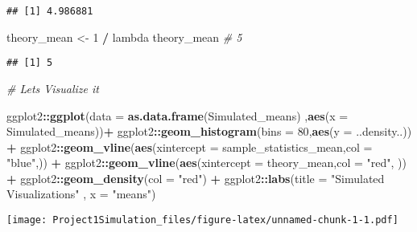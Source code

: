 \documentclass[
]{article}
\newenvironment{Shaded}{\begin{snugshade}}{\end{snugshade}}
\newcommand{\CommentTok}[1]{\textcolor[rgb]{0.56,0.35,0.01}{\textit{#1}}}
\newcommand{\DataTypeTok}[1]{\textcolor[rgb]{0.13,0.29,0.53}{#1}}
\newcommand{\DecValTok}[1]{\textcolor[rgb]{0.00,0.00,0.81}{#1}}
\newcommand{\KeywordTok}[1]{\textcolor[rgb]{0.13,0.29,0.53}{\textbf{#1}}}
\newcommand{\NormalTok}[1]{#1}
\newcommand{\OperatorTok}[1]{\textcolor[rgb]{0.81,0.36,0.00}{\textbf{#1}}}
\newcommand{\StringTok}[1]{\textcolor[rgb]{0.31,0.60,0.02}{#1}}
\begin{document}
\begin{verbatim}
## [1] 4.986881
\end{verbatim}

\begin{Shaded}
\begin{Highlighting}[]
\NormalTok{theory\_mean \textless{}{-}}\StringTok{ }\DecValTok{1} \OperatorTok{/}\StringTok{ }\NormalTok{lambda}
\NormalTok{theory\_mean }\CommentTok{\# 5}
\end{Highlighting}
\end{Shaded}

\begin{verbatim}
## [1] 5
\end{verbatim}

\begin{Shaded}
\begin{Highlighting}[]
\CommentTok{\# Let\textquotesingle{}s Visualize it}

\NormalTok{ggplot2}\OperatorTok{::}\KeywordTok{ggplot}\NormalTok{(}\DataTypeTok{data =} \KeywordTok{as.data.frame}\NormalTok{(Simulated\_means) ,}\KeywordTok{aes}\NormalTok{(}\DataTypeTok{x =}\NormalTok{ Simulated\_means))}\OperatorTok{+}
\StringTok{        }\NormalTok{ggplot2}\OperatorTok{::}\KeywordTok{geom\_histogram}\NormalTok{(}\DataTypeTok{bins =} \DecValTok{80}\NormalTok{,}\KeywordTok{aes}\NormalTok{(}\DataTypeTok{y =}\NormalTok{ ..density..)) }\OperatorTok{+}
\StringTok{        }\NormalTok{ggplot2}\OperatorTok{::}\KeywordTok{geom\_vline}\NormalTok{(}\KeywordTok{aes}\NormalTok{(}\DataTypeTok{xintercept =}\NormalTok{ sample\_statistics\_mean,}\DataTypeTok{col =} \StringTok{"blue"}\NormalTok{,)) }\OperatorTok{+}
\StringTok{        }\NormalTok{ggplot2}\OperatorTok{::}\KeywordTok{geom\_vline}\NormalTok{(}\KeywordTok{aes}\NormalTok{(}\DataTypeTok{xintercept =}\NormalTok{ theory\_mean,}\DataTypeTok{col =} \StringTok{"red"}\NormalTok{,  )) }\OperatorTok{+}\StringTok{ }
\StringTok{        }\NormalTok{ggplot2}\OperatorTok{::}\KeywordTok{geom\_density}\NormalTok{(}\DataTypeTok{col =} \StringTok{"red"}\NormalTok{) }\OperatorTok{+}\StringTok{ }
\StringTok{        }\NormalTok{ggplot2}\OperatorTok{::}\KeywordTok{labs}\NormalTok{(}\DataTypeTok{title =} \StringTok{"Simulated Visualizations"}\NormalTok{ , }\DataTypeTok{x =} \StringTok{"means"}\NormalTok{) }
\end{Highlighting}
\end{Shaded}

\texttt{[image: Project1Simulation\_files/figure-latex/unnamed-chunk-1-1.pdf]}
\end{document}
